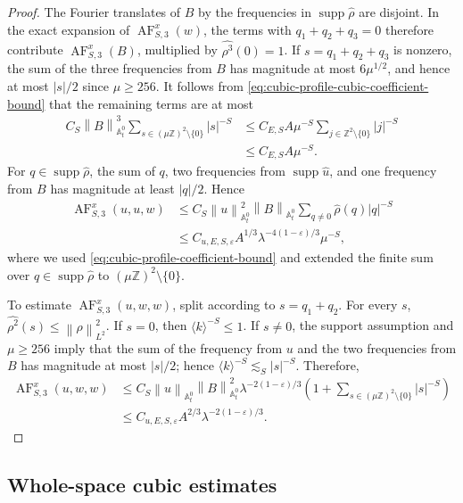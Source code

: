 \documentclass[12pt,reqno,letterpaper]{amsart}
\numberwithin{equation}{section}
\theoremstyle{definition}
\newcommand{\Z}{\mathbb Z}
\newcommand{\A}{\mathbb A}
\newcommand{\eps}{\varepsilon}
\newcommand{\la}{\lambda}
\newcommand{\supp}{\operatorname{supp}}
\newcommand{\norm}[1]{\left\lVert #1\right\rVert}
\newcommand{\abs}[1]{\left\lvert #1\right\rvert}
\begin{document}
\begin{proof}
The Fourier translates of $B$ by the frequencies in
$\supp\widehat\rho$ are disjoint.  In the exact expansion of
$\operatorname{AF}_{S,3}^x(w)$, the terms with
$q_1+q_2+q_3=0$ therefore contribute
$\operatorname{AF}_{S,3}^x(B)$, multiplied by
$\widehat{\rho^3}(0)=1$.  If
$s=q_1+q_2+q_3$ is nonzero, the sum of the three frequencies from $B$
has magnitude at most $6\mu^{1/2}$, and hence at most $\abs s/2$ since
$\mu\geq256$.
It follows from \eqref{eq:cubic-profile-cubic-coefficient-bound} that the
remaining terms are at most
\begin{align*}
 C_S\norm B_{\A^0_t}^3
 \sum_{s\in(\mu\Z)^2\setminus\{0\}}\abs s^{-S}
 &\leq C_{E,S}A\mu^{-S}
 \sum_{j\in\Z^2\setminus\{0\}}\abs j^{-S}\\
 &\leq C_{E,S}A\mu^{-S}.
\end{align*}
For $q\in\supp\widehat\rho$, the sum of $q$,
two frequencies from $\supp\widehat u$, and one frequency from $B$ has
magnitude at least $\abs q/2$.  Hence
\begin{align*}
 \operatorname{AF}_{S,3}^x(u,u,w)
 &\leq C_S\norm u_{\A^0_t}^2\norm B_{\A^0_t}
   \sum_{q\neq0}\widehat\rho(q)\abs q^{-S}
 \\
 &\leq C_{u,E,S,\eps}A^{1/3}
   \la^{-4(1-\eps)/3}\mu^{-S},
\end{align*}
where we used \eqref{eq:cubic-profile-coefficient-bound} and extended the finite
sum over $q\in\supp\widehat\rho$ to
$(\mu\Z)^2\setminus\{0\}$.

To estimate $\operatorname{AF}_{S,3}^x(u,w,w)$, split according to
$s=q_1+q_2$.  For every $s$,
$\widehat{\rho^2}(s)\leq\norm{\rho}_{L^2}^2$.  If $s=0$, then
$\langle k\rangle^{-S}\leq1$.  If $s\neq0$, the support assumption and
$\mu\geq256$ imply that
the sum of the frequency from $u$ and the two frequencies from $B$ has
magnitude at most $\abs s/2$; hence
$\langle k\rangle^{-S}\lesssim_S\abs s^{-S}$.  Therefore,
\begin{align*}
 \operatorname{AF}_{S,3}^x(u,w,w)
 &\leq C_S\norm u_{\A^0_t}\norm B_{\A^0_t}^2
  \la^{-2(1-\eps)/3}
  \left(1+\sum_{s\in(\mu\Z)^2\setminus\{0\}}\abs s^{-S}\right)
 \\
 &\leq C_{u,E,S,\eps}A^{2/3}
  \la^{-2(1-\eps)/3}.
\end{align*}
\end{proof}

\subsection{Whole-space cubic estimates}
\end{document}
